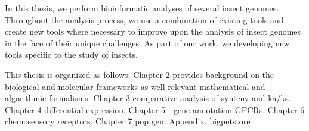 In this thesis, we perform bioinformatic analyses of several insect genomes. Throughout the analysis process, we use a combination of existing tools and create new tools where necessary to improve upon the analysis of insect genomes in the face of their unique challenges.  As part of our work, we developing new tools specific to the study of insects.

This thesis is organized as follows: Chapter 2 provides background on the biological and molecular frameworks as well relevant mathematical and algorithmic formalisms. Chapter 3 comparative analysis of synteny and ka/ks. Chapter 4 differential expression. Chapter 5 - gene annotation GPCRs. Chapter 6 chemosensory receptors. Chapter 7 pop gen. Appendix, bigpetstore
